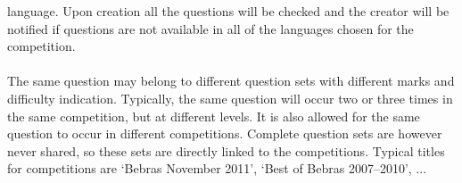 \begin{section}
	language. Upon creation all the questions will be checked and the creator will be
	notified if questions are not available in all of the languages chosen for the
	competition.\\
	\\
	The same question may belong to different question sets with different marks and
	difficulty indication. Typically, the same question will occur two or three times in
	the same competition, but at different levels. It is also allowed for the same
	question to occur in different competitions. Complete question sets are however never
	shared, so these sets are directly linked to the competitions. Typical titles for
	competitions are ‘Bebras November 2011’, ‘Best of Bebras 2007–2010’, ...
	
\end{section}